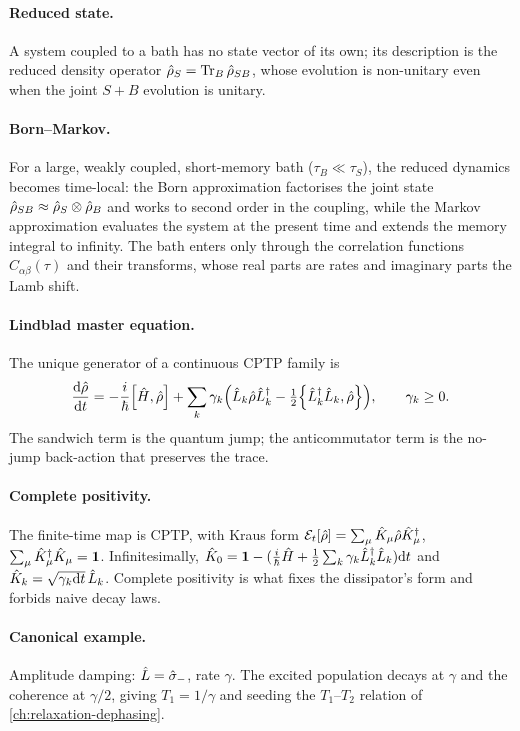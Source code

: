 \clearpage
\begin{chaptersummary}

\paragraph{Reduced state.}
A system coupled to a bath has no state vector of its own; its
description is the reduced density operator
$\hat{\rho}_S=\operatorname{Tr}_B\hat{\rho}_{SB}$, whose evolution is non-unitary even
when the joint $S+B$ evolution is unitary.

\paragraph{Born--Markov.}
For a large, weakly coupled, short-memory bath ($\tau_B\ll\tau_S$),
the reduced dynamics becomes time-local: the Born approximation
factorises the joint state $\hat{\rho}_{SB}\approx\hat{\rho}_S\otimes\hat{\rho}_B$
and works to second order in the coupling, while the Markov
approximation evaluates the system at the present time and extends
the memory integral to infinity. The bath enters only through the
correlation functions $C_{\alpha\beta}(\tau)$ and their transforms,
whose real parts are rates and imaginary parts the Lamb shift.

\paragraph{Lindblad master equation.}
The unique generator of a continuous CPTP family is
\begin{equation}
\frac{\dd\op\rho}{\dd t}
= -\frac{i}{\hbar}\comm{\op H}{\op\rho}
+ \sum_k\gamma_k\Bigl(\op L_k\op\rho\op L_k^\dagger
- \tfrac12\acomm{\op L_k^\dagger\op L_k}{\op\rho}\Bigr),
\qquad \gamma_k\geq 0.
\end{equation}
The sandwich term is the quantum jump; the anticommutator term is
the no-jump back-action that preserves the trace.

\paragraph{Complete positivity.}
The finite-time map is CPTP, with Kraus form
$\mathcal E_t[\hat{\rho}]=\sum_\mu\hat{K}_\mu\hat{\rho}\hat{K}_\mu^\dagger$,
$\sum_\mu\hat{K}_\mu^\dagger\hat{K}_\mu=\mathbf{1}$. Infinitesimally,
$\hat{K}_0=\mathbf{1}-(\tfrac{i}{\hbar}\hat{H}+\tfrac12\sum_k\gamma_k\hat{L}_k^\dagger\hat{L}_k)\dd t$
and $\hat{K}_k=\sqrt{\gamma_k\dd t}\,\hat{L}_k$. Complete positivity is
what fixes the dissipator's form and forbids naive decay laws.

\paragraph{Canonical example.}
Amplitude damping: $\hat{L}=\hat\sigma_-$, rate $\gamma$. The excited
population decays at $\gamma$ and the coherence at $\gamma/2$,
giving $T_1=1/\gamma$ and seeding the $T_1$--$T_2$ relation of
\cref{ch:relaxation-dephasing}.

\end{chaptersummary}

